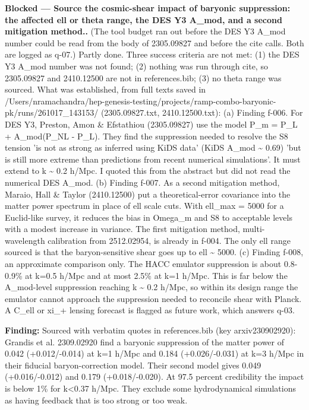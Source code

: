 \documentclass[11pt,a4paper]{article}
\begin{document}
\textbf{Blocked --- Source the cosmic-shear impact of baryonic suppression: the affected ell or theta range, the DES Y3 A\_mod, and a second mitigation method..} (The tool budget ran out before the DES Y3 A\_mod number could be read from the body of 2305.09827 and before the cite calls. Both are logged as q-07.) Partly done. Three success criteria are not met: (1) the DES Y3 A\_mod number was not found; (2) nothing was run through cite, so 2305.09827 and 2410.12500 are not in references.bib; (3) no theta range was sourced. What was established, from full texts saved in /Users/nramachandra/hep-genesis-testing/projects/ramp-combo-baryonic-pk/runs/261017\_143153/ (2305.09827.txt, 2410.12500.txt): (a) Finding f-006. For DES Y3, Preston, Amon \& Efstathiou (2305.09827) use the model P\_m = P\_L + A\_mod(P\_NL - P\_L). They find the suppression needed to resolve the S8 tension 'is not as strong as inferred using KiDS data' (KiDS A\_mod \textasciitilde{} 0.69) 'but is still more extreme than predictions from recent numerical simulations'. It must extend to k \textasciitilde{} 0.2 h/Mpc. I quoted this from the abstract but did not read the numerical DES A\_mod. (b) Finding f-007. As a second mitigation method, Maraio, Hall \& Taylor (2410.12500) put a theoretical-error covariance into the matter power spectrum in place of ell scale cuts. With ell\_max = 5000 for a Euclid-like survey, it reduces the bias in Omega\_m and S8 to acceptable levels with a modest increase in variance. The first mitigation method, multi-wavelength calibration from 2512.02954, is already in f-004. The only ell range sourced is that the baryon-sensitive shear goes up to ell \textasciitilde{} 5000. (c) Finding f-008, an approximate comparison only. The HACC emulator suppression is about 0.8-0.9\% at k=0.5 h/Mpc and at most 2.5\% at k=1 h/Mpc. This is far below the A\_mod-level suppression reaching k \textasciitilde{} 0.2 h/Mpc, so within its design range the emulator cannot approach the suppression needed to reconcile shear with Planck. A C\_ell or xi\_+ lensing forecast is flagged as future work, which answers q-03.

\textbf{Finding:} Sourced with verbatim quotes in references.bib (key arxiv230902920): Grandis et al. 2309.02920 find a baryonic suppression of the matter power of 0.042 (+0.012/-0.014) at k=1 h/Mpc and 0.184 (+0.026/-0.031) at k=3 h/Mpc in their fiducial baryon-correction model. Their second model gives 0.049 (+0.016/-0.012) and 0.179 (+0.018/-0.020). At 97.5 percent credibility the impact is below 1\% for k\textless{}0.37 h/Mpc. They exclude some hydrodynamical simulations as having feedback that is too strong or too weak.
\end{document}
